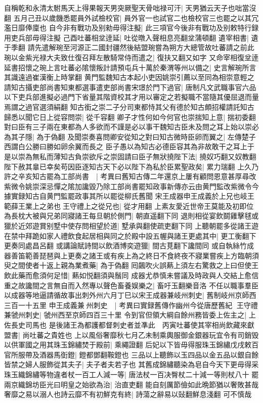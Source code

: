 自稱乾和永清太駙馬天上得果報天男突厥聖天骨咄禄可汗|{
	天男猶云天子也咄當沒翻}
五月己丑以歲饑悉罷員外試檢校官|{
	員外官一也試官二也檢校官三也罷之以其冗濫日靡俸廩也}
自今非有戰功及别勑毋得注擬|{
	此三項官今後非有戰功及别敕特行録用吏兵部毋得注擬}
己酉吐蕃相坌逹延|{
	吐從暾入聲相息亮翻坌蒲頓翻}
遺宰相書|{
	遺于季翻}
請先遣解琬至河源正二國封疆然後結盟琬嘗為朔方大總管故吐蕃請之前此琬以金紫光禄大夫致仕復召拜左散騎常侍而遣之|{
	復扶又翻又如字}
又命宰相復坌逹延書招懷之琬上言吐蕃必隂懷叛計請預屯兵十萬於秦渭等州以備之|{
	史言解琬所言其識遠過崔漢衡上時掌翻}
黄門監魏知古本起小吏因姚崇引薦以至同為相崇意輕之請知古攝吏部尚書知東都選事遣吏部尚書宋璟於門下過官|{
	唐制凡文武職事官六品以下吏兵部進擬必過門下省量其階資校其才用以審定之若擬職不當隨其優屈退而量焉謂之過官選須絹翻}
知古銜之崇二子分司東都恃其父有德於知古頗招權請託知古歸悉以聞它日上從容問崇|{
	從千容翻}
卿子才性何如今何官也崇揣知上意|{
	揣初委翻}
對曰臣有三子兩在東都為人多欲而不謹是必以事干魏知古臣未及問之耳上始以崇必為其子隱|{
	為于偽翻}
及聞崇奏喜問卿安從知之對曰知古微時臣卵而翼之|{
	左傳楚子西謂白公勝曰勝如卵余翼而長之}
臣子愚以為知古必德臣容其為非故敢干之耳上于是以崇為無私而薄知古負崇欲斥之崇固請曰臣子無狀撓陛下法|{
	撓奴巧翻又奴教翻}
陛下赦其辠已幸矣苟因臣逐知古天下必以陛下為私於臣累聖政矣|{
	累力瑞翻}
上久乃許之辛亥知古罷為工部尚書　|{
	考異曰舊知古傳二年還京上屢有顧問恩意甚厚尋改紫微令姚崇深忌憚之隂加讒毀乃除工部尚書罷知政事新傳亦云由黄門監改紫微令今據實録知古自黄門監罷政事其所以罷從柳氏舊聞}
宋王成器申王成義於上兄也岐王範薛王業上之弟也王守禮上之從兄也|{
	從才用翻}
上素友愛近世帝王莫能及初即位為長枕大被與兄弟同寢諸王每旦朝於側門|{
	朝直遥翻下同}
退則相從宴飲鬬雞擊毬或獵於近郊遊賞别墅中使存問相望於道|{
	墅承與翻使疏吏翻下同}
上聽朝罷多從諸王遊在禁中拜跪如家人禮飲食起居相與同之於殿中設五幄與諸王更處其中|{
	更工衡翻下更奏同處昌呂翻}
或講論賦詩間以飲酒博奕遊獵|{
	間古莧翻下讒間同}
或自執絲竹成器善笛範善琵琶與上更奏之諸王或有疾上為之終日不食終夜不寢業嘗疾上方臨朝須臾之間使者十返上親為業煮藥|{
	為于偽翻}
囘飆吹火誤爇上須左右驚救之上曰但使王飲此藥而愈須何足惜|{
	爇如悦翻須與鬚同}
成器尤恭慎未嘗議及時政與人交結上愈信重之故讒間之言無自而入然專以聲色畜養娱樂之|{
	畜吁玉翻樂音洛}
不任以職事羣臣以成器等地逼請循故事出刺外州六月丁巳以宋王成器兼岐州刺史|{
	舊制岐州京師西三百一十五里}
申王成義兼州刺史　|{
	考異曰實録舊傳作幽州今從唐歷舊紀}
王守禮兼虢州刺史|{
	虢州西至京師四百三十里}
令到官但領大綱自餘州務皆委上佐主之|{
	上佐長史司馬也}
是後諸王為都護都督刺史者並凖此　丙寅吐蕃使其宰相尚飲藏來獻盟書|{
	尚吐蕃之貴姓也}
上以風俗奢靡秋七月乙未制乘輿服御金銀器玩宜令有司銷毁以供軍國之用其珠玉錦繡焚于殿前|{
	乘繩證翻}
后妃以下皆毋得服珠玉錦繡戊戌敕百官所服帶及酒器馬衘鐙|{
	鐙都鄧翻鞍鐙也}
三品以上聽飾以玉四品以金五品以銀自餘皆禁之婦人服飾從其夫子|{
	夫子者夫若子也}
其舊成錦繡聽染為皂自今天下更毋得采珠玉織錦繡等物違者杖一百工人減一等|{
	唐法杖一百决臀杖二十減一等則杖八十}
罷兩京織錦坊臣光曰明皇之始欲為治|{
	治直吏翻}
能自刻厲節儉如此晩節猶以奢敗甚哉奢靡之易以溺人也詩云靡不有初鮮克有終|{
	詩蕩之辭易以䜴翻鮮息淺翻}
可不慎哉

